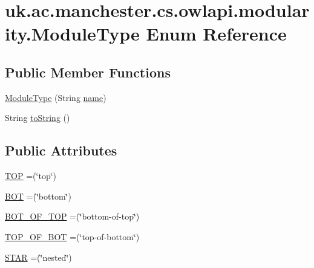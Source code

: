 \hypertarget{enumuk_1_1ac_1_1manchester_1_1cs_1_1owlapi_1_1modularity_1_1_module_type}{\section{uk.\-ac.\-manchester.\-cs.\-owlapi.\-modularity.\-Module\-Type Enum Reference}
\label{enumuk_1_1ac_1_1manchester_1_1cs_1_1owlapi_1_1modularity_1_1_module_type}
}
\subsection*{Public Member Functions}
\begin{DoxyCompactItemize}
\item 
\hyperlink{enumuk_1_1ac_1_1manchester_1_1cs_1_1owlapi_1_1modularity_1_1_module_type_acc8216c9c88203efe76c5d3be2f25632}{Module\-Type} (String \hyperlink{enumuk_1_1ac_1_1manchester_1_1cs_1_1owlapi_1_1modularity_1_1_module_type_a44198db5f341f357b3d0011c09abb6b6}{name})
\item 
String \hyperlink{enumuk_1_1ac_1_1manchester_1_1cs_1_1owlapi_1_1modularity_1_1_module_type_ae9447e5aa3945db40f14852ab6ff41dd}{to\-String} ()
\end{DoxyCompactItemize}
\subsection*{Public Attributes}
\begin{DoxyCompactItemize}
\item 
\hyperlink{enumuk_1_1ac_1_1manchester_1_1cs_1_1owlapi_1_1modularity_1_1_module_type_a7fcf11e90c5fa0c38ba7481f7d1f92cc}{T\-O\-P} =(\char`\"{}top\char`\"{})
\item 
\hyperlink{enumuk_1_1ac_1_1manchester_1_1cs_1_1owlapi_1_1modularity_1_1_module_type_a516b9a7a0b441fe1fe20bf19d4005f87}{B\-O\-T} =(\char`\"{}bottom\char`\"{})
\item 
\hyperlink{enumuk_1_1ac_1_1manchester_1_1cs_1_1owlapi_1_1modularity_1_1_module_type_a9be23c39a70d72b63b886120ee1ad2cb}{B\-O\-T\-\_\-\-O\-F\-\_\-\-T\-O\-P} =(\char`\"{}bottom-\/of-\/top\char`\"{})
\item 
\hyperlink{enumuk_1_1ac_1_1manchester_1_1cs_1_1owlapi_1_1modularity_1_1_module_type_a6eb94f1595752cd4d3e61302a43603d1}{T\-O\-P\-\_\-\-O\-F\-\_\-\-B\-O\-T} =(\char`\"{}top-\/of-\/bottom\char`\"{})
\item 
\hyperlink{enumuk_1_1ac_1_1manchester_1_1cs_1_1owlapi_1_1modularity_1_1_module_type_a2bb705a4bb506642d6278fcbd3a2c3a4}{S\-T\-A\-R} =(\char`\"{}nested\char`\"{})
\end{DoxyCompactItemize}
